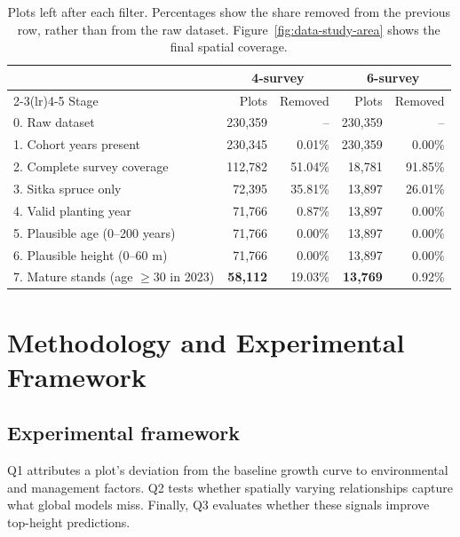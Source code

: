 \documentclass[logo,msc,ai]{infthesis}           %
\begin{document}
\begin{table}[!htbp]
\centering
\scriptsize
\begin{tabular}{lrrrr}
\toprule
& \multicolumn{2}{c}{4-survey} & \multicolumn{2}{c}{6-survey} \\
\cmidrule(lr){2-3}\cmidrule(lr){4-5}
Stage & Plots & Removed & Plots & Removed \\
\midrule
0. Raw dataset
& 230,359 & -- & 230,359 & -- \\
1. Cohort years present
& 230,345 & 0.01\% & 230,359 & 0.00\% \\
2. Complete survey coverage
& 112,782 & 51.04\% & 18,781 & 91.85\% \\
3. Sitka spruce only
& 72,395 & 35.81\% & 13,897 & 26.01\% \\
4. Valid planting year
& 71,766 & 0.87\% & 13,897 & 0.00\% \\
5. Plausible age (0--200 years)
& 71,766 & 0.00\% & 13,897 & 0.00\% \\
6. Plausible height (0--60 m)
& 71,766 & 0.00\% & 13,897 & 0.00\% \\
7. Mature stands (age $\geq 30$ in 2023)
& \textbf{58,112} & 19.03\%
& \textbf{13,769} & 0.92\% \\
\bottomrule
\end{tabular}
\caption{\small{Plots left after each filter. Percentages show the share removed from the previous row, rather than from the raw dataset. Figure~\ref{fig:data-study-area} shows the final spatial coverage.}}
\label{tab:data-cleaning-funnel}
\end{table}


\chapter{Methodology and Experimental Framework} \label{ch:methodology}
\section{Experimental framework}
Q1 attributes a plot's deviation from the baseline growth curve to environmental and management factors. Q2 tests whether spatially varying relationships capture what global models miss. Finally, Q3 evaluates whether these signals improve top-height predictions.
\end{document}
